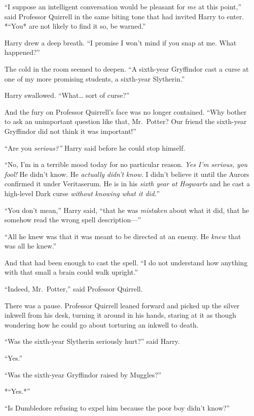 ``I suppose an intelligent conversation would be pleasant for \emph{me}
at this point,'' said Professor Quirrell in the same biting tone that
had invited Harry to enter. *``You* are not likely to find it so, be
warned.''

Harry drew a deep breath. ``I promise I won't mind if you snap at me.
What happened?''

The cold in the room seemed to deepen. ``A sixth-year Gryffindor cast a
curse at one of my more promising students, a sixth-year Slytherin.''

Harry swallowed. ``What\ldots{} sort of curse?''

And the fury on Professor Quirrell's face was no longer contained. ``Why
bother to ask an unimportant question like that, Mr.~Potter? Our friend
the sixth-year Gryffindor did not think it was important!''

``Are you \emph{serious?''} Harry said before he could stop himself.

``No, I'm in a terrible mood today for no particular reason. \emph{Yes
I'm serious, you fool!} He didn't know. He \emph{actually didn't know.}
I didn't believe it until the Aurors confirmed it under Veritaserum. He
is in his \emph{sixth year at Hogwarts} and he cast a high-level Dark
curse \emph{without knowing what it did.}''

``You don't mean,'' Harry said, ``that he was \emph{mistaken} about what
it did, that he somehow read the wrong spell description---''

``All he knew was that it was meant to be directed at an enemy. He
\emph{knew} that was all he knew.''

And that had been enough to cast the spell. ``I do not understand how
anything with that small a brain could walk upright.''

``Indeed, Mr.~Potter,'' said Professor Quirrell.

There was a pause. Professor Quirrell leaned forward and picked up the
silver inkwell from his desk, turning it around in his hands, staring at
it as though wondering how he could go about torturing an inkwell to
death.

``Was the sixth-year Slytherin seriously hurt?'' said Harry.

``Yes.''

``Was the sixth-year Gryffindor raised by Muggles?''

*``Yes.*''

``Is Dumbledore refusing to expel him because the poor boy didn't
know?''


